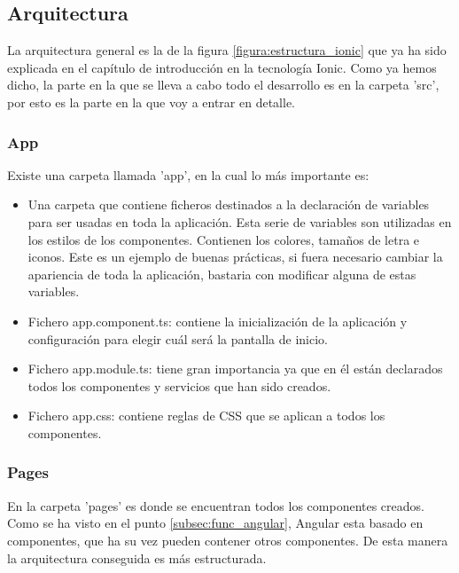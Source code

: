 \documentclass[a4paper, 12pt]{book}
\begin{document}
\subsection{Arquitectura} 
\label{sec:arquitectura}

La arquitectura general es la de la figura \ref{figura:estructura_ionic} que ya ha sido explicada en el cap\'itulo de introducci\'on en la
tecnolog\'ia Ionic. Como ya hemos dicho, la parte en la que se lleva a cabo todo el desarrollo es en la carpeta 'src', por esto es la parte
en la que voy a entrar en detalle.

\subsubsection{App} 
\label{sec:app}

Existe una carpeta llamada 'app', en la cual lo m\'as importante es:

\begin{itemize}
\item Una carpeta que contiene ficheros destinados a la declaraci\'on de variables para ser usadas en toda la aplicaci\'on. Esta serie de variables son utilizadas en los estilos de los componentes.
Contienen los colores, tama\~nos de letra e iconos. Este es un ejemplo de buenas pr\'acticas, si fuera necesario cambiar la apariencia de toda la aplicaci\'on, bastaria con modificar alguna de estas variables.

\item Fichero app.component.ts: contiene la inicializaci\'on de la aplicaci\'on y configuraci\'on para elegir cu\'al ser\'a la pantalla de inicio.

\item Fichero app.module.ts: tiene gran importancia ya que en \'el est\'an declarados todos los componentes y servicios que han sido creados.

\item Fichero app.css: contiene reglas de CSS que se aplican a todos los componentes.

\end{itemize}

\subsubsection{Pages} 
\label{sec:pages}

En la carpeta 'pages' es donde se encuentran todos los componentes creados. Como se ha visto en el punto \ref{subsec:func_angular}, Angular esta basado en componentes, que ha su vez
pueden contener otros componentes. De esta manera la arquitectura conseguida es m\'as estructurada. 
\end{document}
